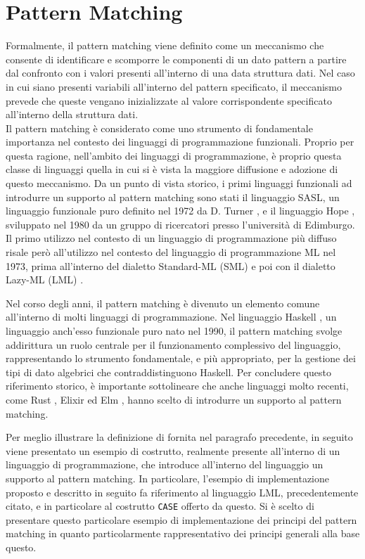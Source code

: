 \section{Pattern Matching}

Formalmente, il pattern matching viene definito come un meccanismo che consente
di identificare e scomporre le componenti di un dato pattern a partire dal
confronto con i valori presenti all’interno di una data struttura dati. Nel
caso in cui siano presenti variabili all’interno del pattern specificato, il
meccanismo prevede che queste vengano inizializzate al valore corrispondente
specificato all’interno della struttura dati.\\

Il pattern matching è considerato come uno strumento di fondamentale importanza
nel contesto dei linguaggi di programmazione funzionali. Proprio per questa
ragione, nell’ambito dei linguaggi di programmazione, è proprio questa classe
di linguaggi quella in cui si è vista la maggiore diffusione e adozione di
questo meccanismo. Da un punto di vista storico, i primi linguaggi funzionali
ad introdurre un supporto al pattern matching sono stati il linguaggio SASL, un
linguaggio funzionale puro definito nel 1972 da D. Turner
\cite{DBLP:journals/spe/Turner79}, e il linguaggio Hope
\cite{DBLP:conf/lfp/BurstallMS80}, sviluppato nel 1980 da un gruppo di
ricercatori presso l'università di Edimburgo. Il primo utilizzo nel contesto di
un linguaggio di programmazione più diffuso risale però all’utilizzo nel
contesto del linguaggio di programmazione ML nel 1973, prima all’interno del
dialetto Standard-ML (SML) \cite{milner1997definition} e poi con il dialetto
Lazy-ML (LML) \cite{DBLP:conf/lfp/Augustsson84}.

Nel corso degli anni, il pattern matching è divenuto un elemento comune
all'interno di molti linguaggi di programmazione. Nel linguaggio Haskell
\cite{DBLP:conf/hopl/HudakHJW07}, un linguaggio anch'esso funzionale puro nato
nel 1990, il pattern matching svolge addirittura un ruolo centrale per il
funzionamento complessivo del linguaggio, rappresentando lo strumento
fondamentale, e più appropriato, per la gestione dei tipi di dato algebrici che
contraddistinguono Haskell. Per concludere questo riferimento storico, è
importante sottolineare che anche linguaggi molto recenti, come Rust
\cite{rust2016}, Elixir \cite{laurent2014introducing} ed Elm \cite{elm2016},
hanno scelto di introdurre un supporto al pattern matching.

Per meglio illustrare la definizione di fornita nel paragrafo precedente, in
seguito viene presentato un esempio di costrutto, realmente presente
all'interno di un linguaggio di programmazione, che introduce all'interno del
linguaggio un supporto al pattern matching. In particolare, l'esempio di
implementazione proposto e descritto in seguito fa riferimento al linguaggio
LML, precedentemente citato, e in particolare al costrutto \texttt{CASE}
offerto da questo. Si è scelto di presentare questo particolare esempio di
implementazione dei principi del pattern matching in quanto particolarmente
rappresentativo dei principi generali alla base questo.

